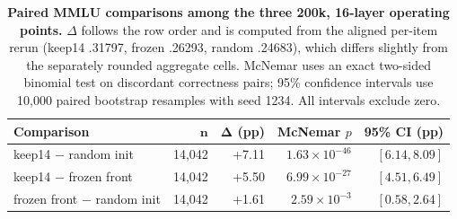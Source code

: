 \begin{table}[t]
\centering
\scriptsize
\setlength{\tabcolsep}{2.5pt}
\begin{tabular}{@{}lrrrr@{}}
\toprule
\textbf{Comparison} & $\boldsymbol{n}$ & $\boldsymbol{\Delta}$ \textbf{(pp)} & \textbf{McNemar $p$} & \textbf{95\% CI (pp)} \\
\midrule
keep14 $-$ random init & 14,042 & +7.11 & $1.63\times10^{-46}$ & $[6.14, 8.09]$ \\
keep14 $-$ frozen front & 14,042 & +5.50 & $6.99\times10^{-27}$ & $[4.51, 6.49]$ \\
frozen front $-$ random init & 14,042 & +1.61 & $2.59\times10^{-3}$ & $[0.58, 2.64]$ \\
\bottomrule
\end{tabular}
\caption{\textbf{Paired MMLU comparisons among the three 200k, 16-layer
operating points.} $\Delta$ follows the row order and is computed from the
aligned per-item rerun (keep14 .31797, frozen .26293, random .24683), which
differs slightly from the separately rounded aggregate cells. McNemar uses an
exact two-sided binomial test on discordant correctness pairs; 95\% confidence
intervals use 10,000 paired bootstrap resamples with seed 1234. All intervals
exclude zero.}
\label{tab:app-paired}
\end{table}
